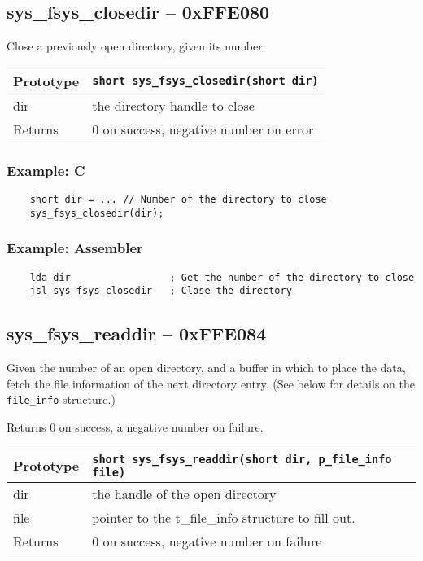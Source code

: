 \subsection*{sys\_fsys\_closedir -- 0xFFE080}
Close a previously open directory, given its number.

\bigskip

\begin{tabular}{|l||l|} \hline
Prototype & \lstinline!short sys_fsys_closedir(short dir)! \\ \hline
dir & the directory handle to close \\ \hline
Returns & 0 on success, negative number on error \\ \hline
\end{tabular}

\subsubsection*{Example: C}
\begin{lstlisting}
    short dir = ... // Number of the directory to close
    sys_fsys_closedir(dir);
\end{lstlisting}

\subsubsection*{Example: Assembler}
\begin{verbatim}
    lda dir                 ; Get the number of the directory to close
    jsl sys_fsys_closedir   ; Close the directory
\end{verbatim}


\subsection*{sys\_fsys\_readdir -- 0xFFE084}
Given the number of an open directory, and a buffer in which to place the data, fetch the file information of the next directory entry. (See below for details on the \verb+file_info+ structure.)

Returns 0 on success, a negative number on failure.

\bigskip

\begin{tabular}{|l||l|} \hline
Prototype & \lstinline!short sys_fsys_readdir(short dir, p_file_info file)! \\ \hline
dir & the handle of the open directory \\ \hline
file & pointer to the t\_file\_info structure to fill out. \\ \hline
Returns & 0 on success, negative number on failure \\ \hline
\end{tabular}

